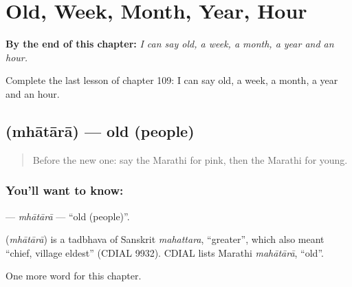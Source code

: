 
\chapter{Old, Week, Month, Year, Hour}
\label{ch:mr-old-week-month-year-hour}

\begin{chapteropening}
\textbf{By the end of this chapter:} \emph{I can say old, a week, a month, a year and an hour.}

Complete the last lesson of chapter 109: I can say old, a week, a month, a year and an hour.
\end{chapteropening}

\section[\texorpdfstring{\mr{म्हातारा} (mhātārā)}{म्हातारा (mhātārā)}]{ (mhātārā) — old (people)}

\label{lesson:MR-C109-mhatara}



\begin{quote}
Before the new one: say the Marathi for pink, then the Marathi for young.
\end{quote}

\subsection*{You'll want to know: }
\textbf{} — \emph{mhātārā} — \textquotedblleft{}old (people)\textquotedblright{}.

\begin{cousinweb}
\textbf{} (\emph{mhātārā}) is a tadbhava of Sanskrit \emph{mahattara}, \textquotedblleft{}greater\textquotedblright{}, which also meant \textquotedblleft{}chief, village eldest\textquotedblright{} (CDIAL 9932). CDIAL lists Marathi \emph{mahātārā}, \textquotedblleft{}old\textquotedblright{}.
\end{cousinweb}

\begin{grammarlens}[title={What you've built}]
One more word for this chapter.
\end{grammarlens}

